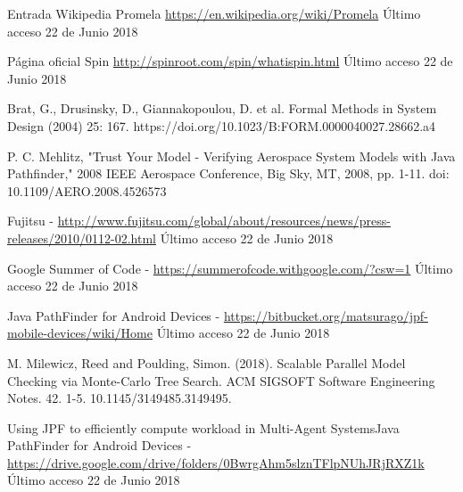 \documentclass[runningheads]{llncs}
\begin{document}
%
%
%
% 
% 
%

\begin{thebibliography}{8}
Entrada Wikipedia Promela \url{https://en.wikipedia.org/wiki/Promela} \'Ultimo acceso 22 de Junio 2018

P\'agina oficial Spin \url{http://spinroot.com/spin/whatispin.html} \'Ultimo acceso 22 de Junio 2018

Brat, G., Drusinsky, D., Giannakopoulou, D. et al. Formal Methods in System Design (2004) 25: 167. https://doi.org/10.1023/B:FORM.0000040027.28662.a4

P. C. Mehlitz, "Trust Your Model - Verifying Aerospace System Models with Java Pathfinder," 2008 IEEE Aerospace Conference, Big Sky, MT, 2008, pp. 1-11.
doi: 10.1109/AERO.2008.4526573

Fujitsu - \url{http://www.fujitsu.com/global/about/resources/news/press-releases/2010/0112-02.html} \'Ultimo acceso 22 de Junio 2018

Google Summer of Code - \url{https://summerofcode.withgoogle.com/?csw=1} \'Ultimo acceso 22 de Junio 2018

Java PathFinder for Android Devices - \url{https://bitbucket.org/matsurago/jpf-mobile-devices/wiki/Home} \'Ultimo acceso 22 de Junio 2018

M. Milewicz, Reed and Poulding, Simon. (2018). Scalable Parallel Model Checking via Monte-Carlo Tree Search. ACM SIGSOFT Software Engineering Notes. 42. 1-5. 10.1145/3149485.3149495. 

Using JPF to efficiently compute workload in Multi-Agent SystemsJava PathFinder for Android Devices - \url{https://drive.google.com/drive/folders/0BwrgAhm5slznTFlpNUhJRjRXZ1k} \'Ultimo acceso 22 de Junio 2018

\end{thebibliography}
\end{document}
